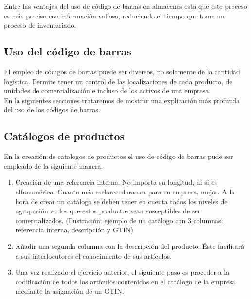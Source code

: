 Entre las ventajas del uso de código de barras en almacenes esta que este proceso es más preciso con información valiosa, reduciendo el tiempo que toma un proceso de inventariado.

\subsection{Uso del código de barras}

El empleo de códigos de barras puede ser diversos, no solamente de la cantidad logística. Permite tener un control de las localizaciones de cada producto, de unidades de comercialización e incluso de los activos de una empresa.\\ [\citep{CCCB:2019:Online}]

En la siguientes secciones trataremos de mostrar una explicación más profunda del uso de los códigos de barras.\\

\subsection{Catálogos de productos}
En la creación de catalogos de productos el uso de código de barras pude ser empleado de la siguiente manera. \citep{CCCB:2019:Online}

\begin{enumerate}

\item Creación de una referencia interna. No importa su longitud, ni si es alfanumérica. Cuanto más esclarecedora sea para su empresa, mejor. A la hora de crear un catálogo se deben tener en cuenta todos los niveles de agrupación en los que estos productos sean susceptibles de ser comercializados. (Ilustración: ejemplo de un catálogo con 3 columnas: referencia interna, descripción y GTIN)

\item Añadir una segunda columna con la descripción del producto. Ésto facilitará a sus interlocutores el conocimiento de sus artículos.

\item Una vez realizado el ejercicio anterior, el siguiente paso es proceder a la codificación de todos los artículos contenidos en el catálogo de la empresa mediante la asignación de un GTIN.
\end{enumerate}

